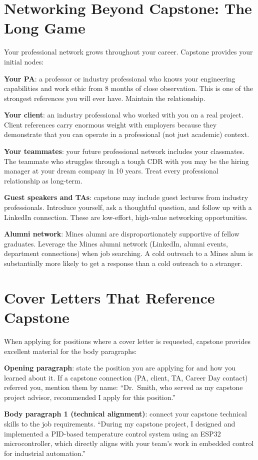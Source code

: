 \section{Networking Beyond Capstone: The Long Game}
Your professional network grows throughout your career. Capstone provides your initial nodes:

\textbf{Your PA}: a professor or industry professional who knows your engineering capabilities and work ethic from 8 months of close observation. This is one of the strongest references you will ever have. Maintain the relationship.

\textbf{Your client}: an industry professional who worked with you on a real project. Client references carry enormous weight with employers because they demonstrate that you can operate in a professional (not just academic) context.

\textbf{Your teammates}: your future professional network includes your classmates. The teammate who struggles through a tough CDR with you may be the hiring manager at your dream company in 10 years. Treat every professional relationship as long-term.

\textbf{Guest speakers and TAs}: capstone may include guest lectures from industry professionals. Introduce yourself, ask a thoughtful question, and follow up with a LinkedIn connection. These are low-effort, high-value networking opportunities.

\textbf{Alumni network}: Mines alumni are disproportionately supportive of fellow graduates. Leverage the Mines alumni network (LinkedIn, alumni events, department connections) when job searching. A cold outreach to a Mines alum is substantially more likely to get a response than a cold outreach to a stranger.



\section{Cover Letters That Reference Capstone}
When applying for positions where a cover letter is requested, capstone provides excellent material for the body paragraphs:

\textbf{Opening paragraph}: state the position you are applying for and how you learned about it. If a capstone connection (PA, client, TA, Career Day contact) referred you, mention them by name: ``Dr.~Smith, who served as my capstone project advisor, recommended I apply for this position.''

\textbf{Body paragraph 1 (technical alignment)}: connect your capstone technical skills to the job requirements. ``During my capstone project, I designed and implemented a PID-based temperature control system using an ESP32 microcontroller, which directly aligns with your team's work in embedded control for industrial automation.''

